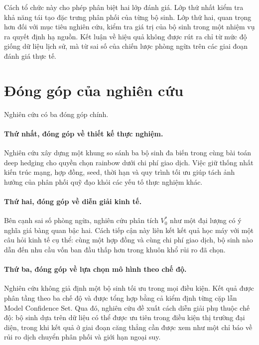 Cách tổ chức này cho phép phân biệt hai lớp đánh giá. Lớp thứ nhất kiểm tra
khả năng tái tạo đặc trưng phân phối của từng bộ sinh. Lớp thứ hai, quan trọng
hơn đối với mục tiêu nghiên cứu, kiểm tra giá trị của bộ sinh trong một nhiệm
vụ ra quyết định hạ nguồn. Kết luận về hiệu quả không được rút ra chỉ từ mức độ
giống dữ liệu lịch sử, mà từ sai số của chiến lược phòng ngừa trên các giai
đoạn đánh giá thực tế.

\section{Đóng góp của nghiên cứu}
\label{sec:dong-gop-nghien-cuu}

Nghiên cứu có ba đóng góp chính.

\paragraph{Thứ nhất, đóng góp về thiết kế thực nghiệm.}
Nghiên cứu xây dựng một khung so sánh ba bộ sinh đa biến trong cùng bài toán
deep hedging cho quyền chọn rainbow dưới chi phí giao dịch. Việc giữ thống
nhất kiến trúc mạng, hợp đồng, seed, thời hạn và quy trình tối ưu giúp tách ảnh
hưởng của phân phối quỹ đạo khỏi các yếu tố thực nghiệm khác.

\paragraph{Thứ hai, đóng góp về diễn giải kinh tế.}
Bên cạnh sai số phòng ngừa, nghiên cứu phân tích $V_0^{*}$ như một đại lượng có
ý nghĩa giá bàng quan bậc hai. Cách tiếp cận này liên kết kết quả học máy với
một câu hỏi kinh tế cụ thể: cùng một hợp đồng và cùng chi phí giao dịch, bộ
sinh nào dẫn đến nhu cầu vốn ban đầu thấp hơn trong khuôn khổ rủi ro đã chọn.

\paragraph{Thứ ba, đóng góp về lựa chọn mô hình theo chế độ.}
Nghiên cứu không giả định một bộ sinh tối ưu trong mọi điều kiện. Kết quả được
phân tầng theo ba chế độ và được tổng hợp bằng cả kiểm định từng cặp lẫn Model
Confidence Set. Qua đó, nghiên cứu đề xuất cách diễn giải phụ thuộc chế độ:
bộ sinh dựa trên dữ liệu có thể được ưu tiên trong điều kiện thị trường đại
diện, trong khi kết quả ở giai đoạn căng thẳng cần được xem như một chỉ báo về
rủi ro dịch chuyển phân phối và giới hạn ngoại suy.

